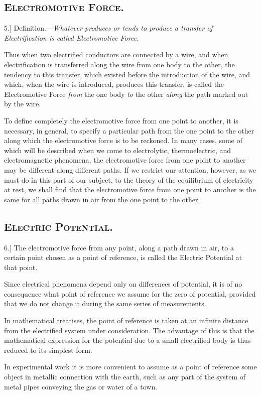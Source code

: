 \documentclass[12pt,oneside]{book}[2021/10/04]
\newcommand{\Heading}{\centering\normalfont}
\newcommand{\Section}[1]{\subsection*{\normalsize\Heading\scshape #1}}
\newcommand{\Runhead}[1]{\fancyhead[C]{\iffloatpage{}{\small#1}}}
\newcommand{\article}[1]{\phantomsection \label{art:#1}{#1.]}}
\newcommand{\¬}{\hphantom{0}}
\begin{document}
\Section{Electromotive Force.}

\article{5}
Definition.---\textit{Whatever produces or tends to produce a transfer
of Electrification is called Electromotive Force.}

Thus when two electrified conductors are connected by a wire,
and when electrification is transferred along the wire from one
body to the other, the tendency to this transfer, which existed
before the introduction of the wire, and which, when the wire is
introduced, produces this transfer, is called the Electromotive
Force \textit{from} the one body \textit{to} the other \textit{along} the path marked out
by the wire.

To define completely the electromotive force from one point to
another, it is necessary, in general, to specify a particular path from
the one point to the other along which the electromotive force is
to be reckoned. In many cases, some of which will be described
when we come to electrolytic, thermoelectric, and electromagnetic
phenomena, the electromotive force from one point to another may
be different along different paths. If we restrict our attention,
however, as we must do in this part of our subject, to the theory of
the equilibrium of electricity at rest, we shall find that the electromotive
force from one point to another is the same for all paths
drawn in air from the one point to the other.
\Runhead{ELECTROMOTIVE FORCE.}

\Section{Electric Potential.}

\article{6} The electromotive force from any point, along a path drawn
in air, to a certain point chosen as a point of reference, is called
the Electric Potential at that point.

Since electrical phenomena depend only on differences of potential,
it is of no consequence what point of reference we assume for
the zero of potential, provided that we do not change it during
the same series of measurements.

In mathematical treatises, the point of reference is taken at an
infinite distance from the electrified system under consideration.
The advantage of this is that the mathematical expression for the
potential due to a small electrified body is thus reduced to its
simplest form.

In experimental work it is more convenient to assume as a point
of reference some object in metallic connection with the earth, such
as any part of the system of metal pipes conveying the gas or
water of a town.
\end{document}
